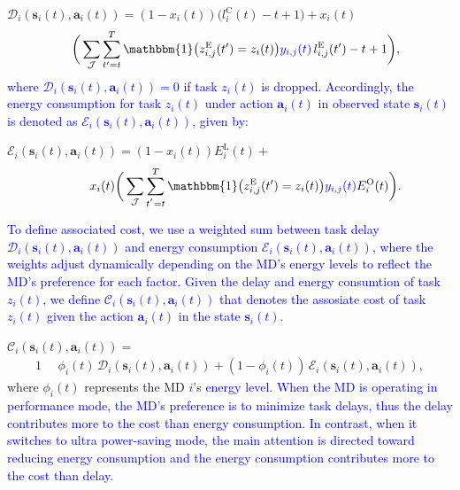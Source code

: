 \documentclass[10pt, journal,letterpaper]{IEEEtran}
\begin{document}
$\mathcal{D}_i(\boldsymbol{s}_i(t),\boldsymbol{a}_i(t)) = (1-x_i(t))\Big(l_i^{\text{C}}(t) - t + 1\Big)  +  x_i(t)$
\begin{alignat}{1}
	\;\;\;\,\bigg( \sum\limits_{\mathcal{J}} \sum\limits_{t'=t}^{T} \mathbbm{1}\big(z_{i,j}^{\text{E}}(t') = z_i(t)\big) \textcolor{blue}{y_{i,j}(t)} \, l_{i,j}^{\text{E}}(t') - t +1\bigg),
	\label{21}  
\end{alignat} 
\textcolor{blue}{where $\mathcal{D}_i(\boldsymbol{s}_i(t),\boldsymbol{a}_i(t))= 0$ if task $z_i(t)$ is dropped. Accordingly, the energy consumption for task $z_i(t)$ under action $\boldsymbol{a}_i(t)$ in observed state $\boldsymbol{s}_i(t)$ is denoted as $\mathcal{E}_i(\boldsymbol{s}_i(t), \boldsymbol{a}_i(t))$, given by:}\vspace{2mm}

$\mathcal{E}_i(\boldsymbol{s}_i(t),\boldsymbol{a}_i(t)) = (1-x_i(t)) E_i^{\text{L}}(t)+$
\begin{alignat}{1}
\hspace{0.9cm} x_i(t)\bigg( \sum\limits_{\mathcal{J}} \sum\limits_{t^{'}=t}^{T}\mathbbm{1}\big(z_{i,j}^{\text{E}}(t') = z_i(t)\big) \textcolor{blue}{y_{i,j}(t)}  E_i^{\text{O}}(t)  \bigg).
	\label{22}  
\end{alignat}

\textcolor{blue}{To define associated cost, we use a weighted sum between task delay $\mathcal{D}_i(\boldsymbol{s}_i(t),\boldsymbol{a}_i(t))$ and energy consumption $\mathcal{E}_i(\boldsymbol{s}_i(t),\boldsymbol{a}_i(t))$, where the weights adjust dynamically depending on the MD's energy levels to reflect the MD's preference for each factor.
Given the delay and energy consumtion of task $z_i(t)$, we define $\mathcal{C}_i(\boldsymbol{s}_i(t),\boldsymbol{a}_i(t))$ that denotes the assosiate cost of task $z_i(t)$ given the action $\boldsymbol{a}_i(t)$ in the state $\boldsymbol{s}_i(t)$.} \vspace{2mm}


$\mathcal{C}_i(\boldsymbol{s}_i(t),\boldsymbol{a}_i(t)) =$
\begin{alignat}{1}
\,\,\,\,\,\,\,\,\phi_i(t) \, \mathcal{D}_i(\boldsymbol{s}_i(t),\boldsymbol{a}_i(t)) +(1-\phi_i(t)) \, \mathcal{E}_i(\boldsymbol{s}_i(t),\boldsymbol{a}_i(t)),
	\label{23}  
\end{alignat}
where $\phi_i(t)$ represents the MD $i$'s \textcolor{blue}{energy level}. 
\textcolor{blue}{When the MD is operating in performance mode, the MD's preference is to minimize task delays, thus the delay contributes more to the cost than energy consumption. In contrast, when it switches to ultra power-saving mode, the main attention is directed toward reducing energy consumption and the energy consumption contributes more to the cost than delay.}
\end{document}
